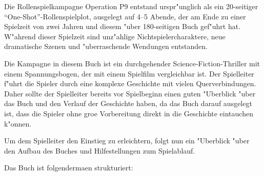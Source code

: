 
Die Rollenspielkampagne Operation P9 entstand urspr"unglich als ein 20-seitiger ``One-Shot''-Rollenspielplot, ausgelegt auf 4--5 Abende, der am Ende zu einer Spielzeit von zwei Jahren und diesem "uber 180-seitigen Buch gef"uhrt hat. W"ahrend dieser Spielzeit sind unz"ahlige Nichtspielercharaktere, neue dramatische Szenen und "uberraschende Wendungen entstanden.

Die Kampagne in diesem Buch ist ein durchgehender Science-Fiction-Thriller mit einem Spannungsbogen, der mit einem Spielfilm vergleichbar ist. Der Spielleiter f"uhrt die Spieler durch eine komplexe Geschichte mit vielen Querverbindungen. Daher sollte der Spielleiter bereits vor Spielbeginn einen guten "Uberblick "uber das Buch und den Verlauf der Geschichte haben, da das Buch darauf ausgelegt ist, dass die Spieler ohne gro\3e Vorbereitung direkt in die Geschichte eintauchen k"onnen.

Um dem Spielleiter den Einstieg zu erleichtern, folgt nun ein "Uberblick "uber den Aufbau des Buches und Hilfestellungen zum Spielablauf.


Das Buch ist folgenderma\3en strukturiert:

